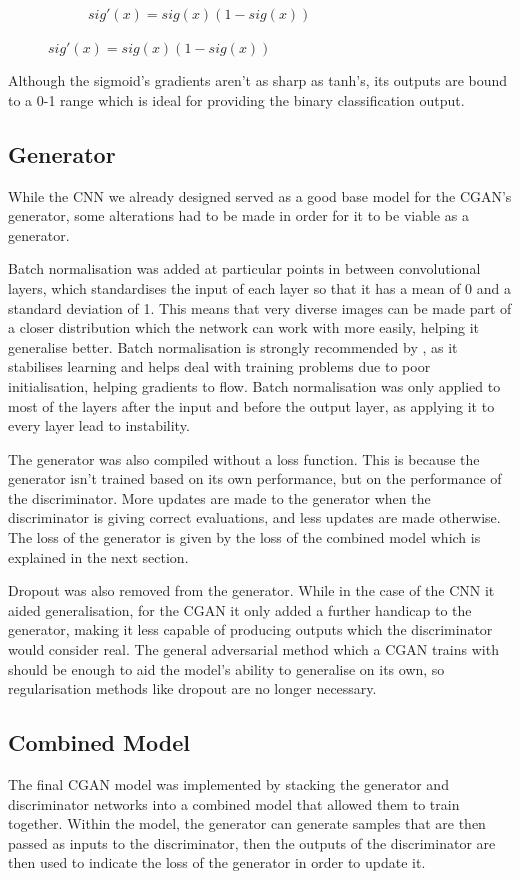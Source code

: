 \documentclass{l4proj}
\begin{document}
\begin{figure}[H]
\begin{subfigure}[b]{0.4\textwidth}
        \caption{$sig'(x) = sig(x)(1-sig(x))$} 
    \end{subfigure} 
\end{figure}

Although the sigmoid's gradients aren't as sharp as tanh's, its outputs are bound to a 0-1 range which is ideal for providing the binary classification output.

\subsection{Generator}
While the CNN we already designed served as a good base model for the CGAN's generator, some alterations had to be made in order for it to be viable as a generator.

Batch normalisation was added at particular points in between convolutional layers, which standardises the input of each layer so that it has a mean of 0 and a standard deviation of 1. This means that very diverse images can be made part of a closer distribution which the network can work with more easily, helping it generalise better. Batch normalisation is strongly recommended by \cite{DCGAN}, as it stabilises learning and helps deal with training problems due to poor initialisation, helping gradients to flow. Batch normalisation was only applied to most of the layers after the input and before the output layer, as applying it to every layer lead to instability.

The generator was also compiled without a loss function. This is because the generator isn't trained based on its own performance, but on the performance of the discriminator. More updates are made to the generator when the discriminator is giving correct evaluations, and less updates are made otherwise. The loss of the generator is given by the loss of the combined model which is explained in the next section.

Dropout was also removed from the generator. While in the case of the CNN it aided generalisation, for the CGAN it only added a further handicap to the generator, making it less capable of producing outputs which the discriminator would consider real. The general adversarial method which a CGAN trains with should be enough to aid the model's ability to generalise on its own, so regularisation methods like dropout are no longer necessary.

\subsection{Combined Model}
The final CGAN model was implemented by stacking the generator and discriminator networks into a combined model that allowed them to train together. Within the model, the generator can generate samples that are then passed as inputs to the discriminator, then the outputs of the discriminator are then used to indicate the loss of the generator in order to update it. 
\end{document}
